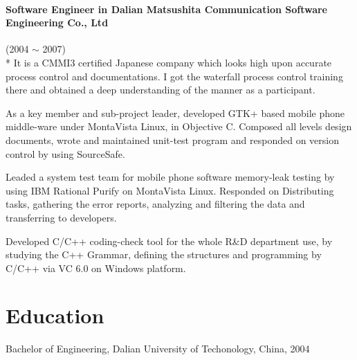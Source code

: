 \documentclass[a4paper,11pt]{article}
\begin{document}
\paragraph{Software Engineer in Dalian Matsushita Communication Software Engineering Co., Ltd} (2004 $\sim$ 2007) \\*
It is a CMMI3 certified Japanese company which looks high upon accurate process control and documentations. I got the waterfall process control training there and obtained a deep understanding of the manner as a participant. 
\begin{itemize*}
    \setlength\itemsep{0.4em}
  \item As a key member and sub-project leader, developed GTK+ based mobile phone middle-ware under MontaVista Linux, in Objective C. Composed all levels design documents, wrote and maintained unit-test program and responded on version control by using SourceSafe.
  \item Leaded a system test team for mobile phone software memory-leak testing by using IBM Rational Purify on MontaVista Linux. Responded on Distributing tasks, gathering the error reports, analyzing and filtering the data and transferring to developers.
  \item Developed C/C++ coding-check tool for the whole R\&D department use, by studying the C++ Grammar, defining the structures and programming by C/C++ via VC 6.0 on Windows platform.
\end{itemize*}

\section*{Education}
Bachelor of Engineering, Dalian University of Techonology, China, 2004

\begin{comment}
\begin{tabular}{l l}
  Duration:   & 2000 - 2004 \\
  University: & Dalian University of Technology \\
  Degree:     & Bachelor of Engineering \\
  Major:      & Electronic and Information Engineering \\
  Minor:      & International Economics and Trade \\
  Country:    & China \\
\end{tabular}
\end{comment}
\end{document}
